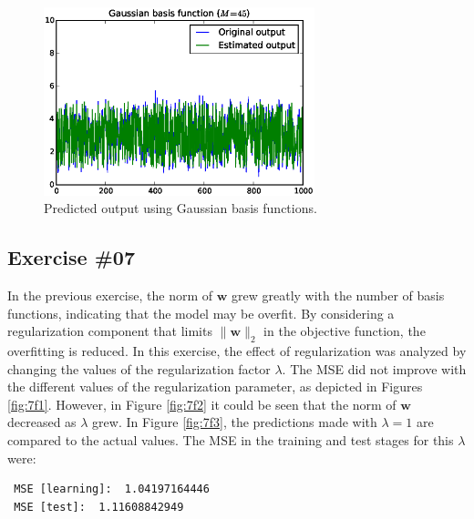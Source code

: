 \documentclass[a4paper,12pt]{article}
\newcommand{\mb}[1]{\ensuremath{\mathbf{#1}}}
\begin{document}
\begin{figure}[htb]
 \centering
 \includegraphics[width=0.7\textwidth]{./figures/6f4.eps}
 \caption{Predicted output using Gaussian basis functions.}
 \label{fig:6f4}
\end{figure}

\cleardoublepage
\subsection*{Exercise \#07}
In the previous exercise, the norm of $\mb{w}$ grew greatly with the number of basis functions, indicating that the model may be overfit. By considering a regularization component that limits $\|\mb{w}\|_2$ in the objective function, the overfitting is reduced. In this exercise, the effect of regularization was analyzed by changing the values of the regularization factor $\lambda$. The MSE did not improve with the different values of the regularization parameter, as depicted in Figures \ref{fig:7f1}. However, in Figure \ref{fig:7f2} it could be seen that the norm of $\mb{w}$ decreased as $\lambda$ grew. In Figure \ref{fig:7f3}, the predictions made with $\lambda=1$ are compared to the actual values. The MSE in the training and test stages for this $\lambda$ were:
\begin{verbatim}
 MSE [learning]:  1.04197164446
 MSE [test]:  1.11608842949
\end{verbatim}
\end{document}
